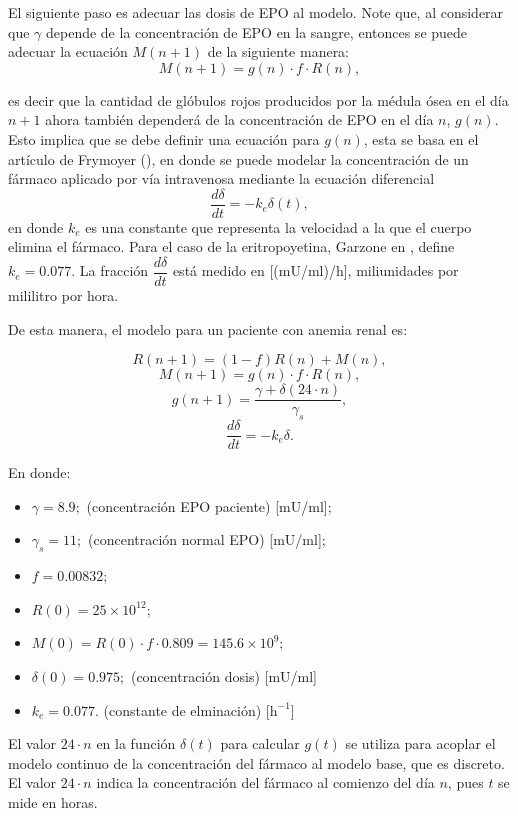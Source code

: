 El siguiente paso es adecuar las dosis de EPO al modelo. Note que, al considerar que $\gamma$ depende de la concentración de EPO en la sangre, entonces se puede adecuar la ecuación $M(n+1)$ de la siguiente manera:
$$M(n+1)=g(n)\cdot f \cdot R(n),$$

es decir que la cantidad de glóbulos rojos producidos por la médula ósea en el día $n+1$ ahora también dependerá de la concentración de EPO en el día $n$, $g(n)$. Esto implica que se debe definir una ecuación para $g(n)$, esta se basa en el artículo de Frymoyer (\cite{FRYMOYER2019123}), en donde se puede modelar la concentración de un fármaco aplicado por vía intravenosa mediante la ecuación diferencial
$$\dfrac{d\delta}{dt}=-k_e \delta(t),$$
en donde $k_e$ es una constante que representa la velocidad a la que el cuerpo elimina el fármaco. Para el caso de la eritropoyetina, Garzone en \cite{GARZONE2012547}, define $k_e=0.077$. La fracción $\dfrac{d\delta}{dt}$ está medido en [(mU/ml)/h], miliunidades por mililitro por hora.

De esta manera, el modelo para un paciente con anemia renal es:

$$R(n+1)=(1-f)R(n)+M(n),$$
$$M(n+1)=g(n) \cdot f\cdot R(n),$$
$$g(n+1)=\dfrac{\gamma + \delta(24\cdot n)}{\gamma_s},$$
$$\dfrac{d\delta}{dt}=-k_e \delta.$$

En donde:
\begin{itemize}
    \item $\gamma=8.9;$ (concentración EPO paciente) [mU/ml];
    \item $\gamma_s=11;$ (concentración normal EPO) [mU/ml];
    \item $f=0.00832;$
    \item $R(0) = 25\times 10^{12};$
    \item $M(0) = R(0)\cdot f \cdot 0.809 = 145.6\times 10^{9};$
    \item $\delta(0) = 0.975;$ (concentración dosis) [mU/ml]
    \item $k_e=0.077.$ (constante de elminación) [$\textrm{h}^{-1}$]
\end{itemize}

El valor $24\cdot n$ en la función $\delta(t)$ para calcular $g(t)$ se utiliza para acoplar el modelo continuo de la concentración del fármaco al modelo base, que es discreto. El valor $24 \cdot n$ indica la concentración del fármaco al comienzo del día $n$, pues $t$ se mide en horas.

